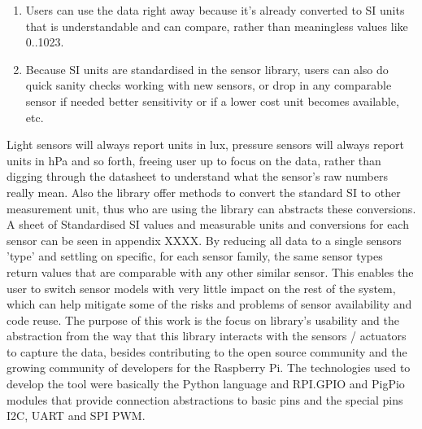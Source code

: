 \documentclass{acm_proc_article-sp}
\begin{document}
\begin{enumerate}
\item Users can use the data right away because it's already converted to SI units that is understandable and can compare, rather than meaningless values like 0..1023.
\item Because SI units are standardised in the sensor library, users can also do quick sanity checks working with new sensors, or drop in any comparable sensor if needed better sensitivity or if a lower cost unit becomes available, etc.
\end{enumerate}

Light sensors will always report units in lux, pressure sensors will always report units in hPa and so forth, freeing user up to focus on the data, rather than digging through the datasheet to understand what the sensor's raw numbers really mean. Also the library offer methods to convert the standard SI to other measurement unit, thus who are using the library can abstracts these conversions. A sheet of Standardised SI values and measurable units and conversions for each sensor can be seen in appendix XXXX.
\newline
\newline
By reducing all data to a single sensors 'type' and settling on specific, for each sensor family, the same sensor types return values that are comparable with any other similar sensor. This enables the user to switch sensor models with very little impact on the rest of the system, which can help mitigate some of the risks and problems of sensor availability and code reuse.
\newline
\newline
The purpose of this work is the focus on library's usability and the abstraction from the way that this library interacts with the sensors / actuators to capture the data, besides contributing to the open source community and the growing community of developers for the Raspberry Pi.
\newline
\newline
The technologies used to develop the tool were basically the Python language and RPI.GPIO and PigPio modules that provide connection abstractions to basic pins and the special pins I2C, UART and SPI PWM.
\end{document}
